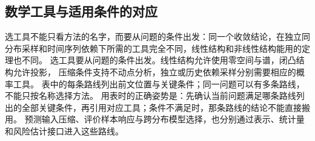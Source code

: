 \subsection{数学工具与适用条件的对应}
\label{sec:future-tool-condition-correspondence}

选工具不能只看方法的名字，而要从问题的条件出发：同一个收敛结论，在独立同分布采样和时间序列依赖下所需的工具完全不同，线性结构和非线性结构能用的定理也不同。
选工具要从问题的条件出发。线性结构允许使用零空间与谱，闭凸结构允许投影，
压缩条件支持不动点分析，独立或历史依赖采样分别需要相应的概率工具。
表中的每条路线列出前文位置与关键条件；同一问题可以有多条路线，不能只按名称选择方法。
用表时的正确姿势是：先确认当前问题满足哪条路线列出的全部关键条件，再引用对应工具；条件不满足时，那条路线的结论不能直接搬用。
预测输入压缩、评价样本响应与跨分布模型选择，也分别通过表示、统计量和风险估计接口进入这些路线。

